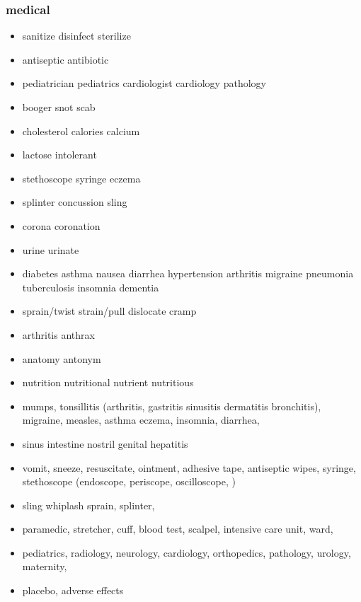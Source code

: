 \documentclass[a4paper,11pt,twoside]{book}
\begin{document}
\subsubsection{medical}
\begin{itemize}
	\item sanitize disinfect sterilize
	
	\item antiseptic antibiotic
	\item pediatrician pediatrics cardiologist cardiology pathology
	
	\item booger snot scab
	
	\item cholesterol calories calcium  
	\item lactose intolerant 
	\item stethoscope syringe eczema
	\item splinter concussion sling

	\item corona coronation
			
	\item urine urinate
			
	\item diabetes asthma nausea diarrhea hypertension arthritis migraine pneumonia tuberculosis insomnia dementia 
		
	\item sprain/twist strain/pull dislocate cramp

	\item arthritis anthrax 
	
	\item anatomy antonym

	\item nutrition nutritional nutrient nutritious

	\item mumps, tonsillitis (arthritis, gastritis sinusitis dermatitis bronchitis), migraine, measles, asthma eczema, insomnia, diarrhea, 

	\item sinus intestine nostril genital hepatitis 

	\item vomit, sneeze, resuscitate, ointment, adhesive tape, antiseptic wipes, syringe, 
stethoscope (endoscope, periscope, oscilloscope, )

	\item sling whiplash sprain, splinter,

	\item paramedic, stretcher, cuff, blood test, scalpel, intensive care unit, ward, 

	\item pediatrics, radiology, neurology, cardiology, orthopedics, pathology, urology, maternity,

	\item placebo, adverse effects 
\end{itemize}
 
\end{document}
